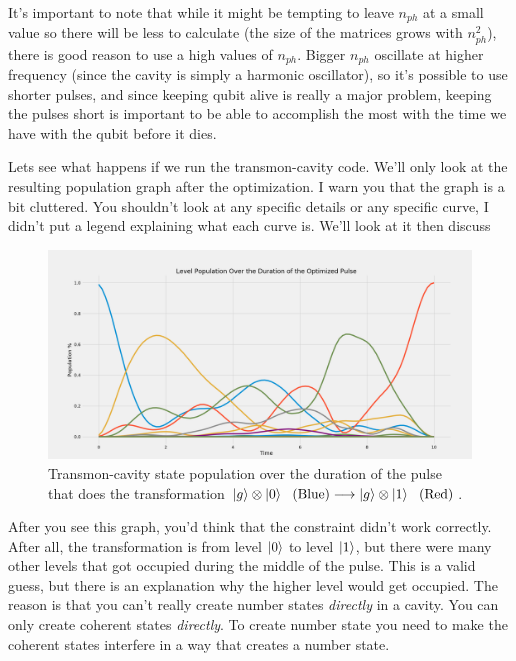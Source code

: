 It's important to note that while it might be tempting to leave $n_{ph}$ at a small value so there will be less to calculate (the size of the matrices grows with $n_{ph}^2$), there is good reason to use a high values of $n_{ph}$. Bigger $n_{ph}$ oscillate at higher frequency (since the cavity is simply a harmonic oscillator), so it's possible to use shorter pulses, and since keeping qubit alive is really a major problem, keeping the pulses short is important to be able to accomplish the most with the time we have with the qubit before it dies.

Lets see what happens if we run the transmon-cavity code. We'll only look at the resulting population graph after the optimization. I warn you that the graph is a bit cluttered. You shouldn't look at any specific details or any specific curve, I didn't put a legend explaining what each curve is. We'll look at it then discuss

\begin{figure}[H]
    \centering
    \includegraphics[width=1\columnwidth]{Results/transmon-cavity/g0-g1-level-population.png}
    \caption{Transmon-cavity state population over the duration of the pulse that does the transformation $\ket{g} \otimes \ket{0}\ \text{ (Blue)} \longrightarrow \ket{g} \otimes \ket{1}\ \text{ (Red)}$.}
    \label{fig:transmon-cavity-population}
\end{figure}
After you see this graph, you'd think that the constraint didn't work correctly. After all, the transformation is from level $\ket{0}$ to level $\ket{1}$, but there were many other levels that got occupied during the middle of the pulse. This is a valid guess, but there is an explanation why the higher level would get occupied. The reason is that you can't really create number states \textit{directly} in a cavity. You can only create coherent states \textit{directly}. To create  number state you need to make the coherent states interfere in a way that creates a number state.

